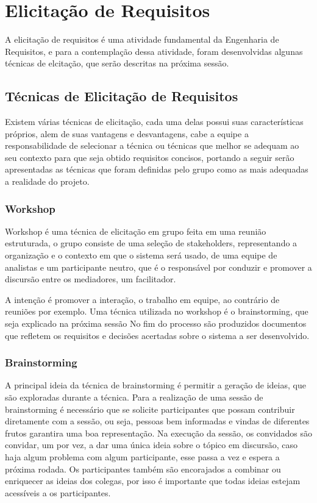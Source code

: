 \chapter[Elicitação de Requisitos]{Elicitação de Requisitos}\label{cap1}
  A elicitação de requisitos é uma atividade fundamental da Engenharia de Requisitos,
e para a contemplação dessa atividade, foram desenvolvidas algunas técnicas de elcitação, que serão descritas na
próxima sessão.

\section{Técnicas de Elicitação de Requisitos}

  Existem várias técnicas de elicitação, cada uma delas possui suas características próprios,
alem de suas vantagens e desvantagens, cabe a equipe a responsabilidade de selecionar a técnica ou técnicas
que melhor se adequam ao seu contexto para que seja obtido requisitos concisos, portando a seguir serão
apresentadas as técnicas que foram definidas pelo grupo como as mais adequadas a realidade do projeto.
\subsection{Workshop}
  Workshop é uma técnica de elicitação em grupo feita em uma reunião estruturada,
o grupo consiste de uma seleção de stakeholders, representando a organização e o contexto em que o
sistema será usado, de uma equipe de analistas e um participante neutro, que é o responsável por conduzir e
promover a discursão entre os mediadores, um facilitador.

  A intenção é promover a interação, o trabalho em equipe, ao contrário de reuniões por exemplo.
Uma técnica utilizada no workshop é o brainstorming, que seja explicado na próxima sessão
No fim do processo são produzidos documentos que refletem os requisitos e decisões acertadas sobre
o sistema a ser desenvolvido.
\subsection{Brainstorming}
  A principal ideia da técnica de brainstorming é permitir a geração de ideias,
que são exploradas durante a técnica. Para a realização de uma sessão de brainstorming é
necessário que se solicite participantes que possam contribuir diretamente com a sessão,
ou seja, pessoas bem informadas e vindas de diferentes frutos garantira uma boa representação.
Na execução da sessão, os convidados são convidar, um por vez, a dar uma única ideia sobre o tópico em discursão,
caso haja algum problema com algum participante, esse passa a vez e espera a próxima rodada.
Os participantes também são encorajados a combinar ou enriquecer as ideias dos colegas, por isso é importante
que todas ideias estejam acessíveis a os participantes.

